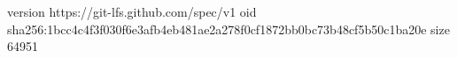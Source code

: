 version https://git-lfs.github.com/spec/v1
oid sha256:1bcc4c4f3f030f6e3afb4eb481ae2a278f0cf1872bb0bc73b48cf5b50c1ba20e
size 64951
